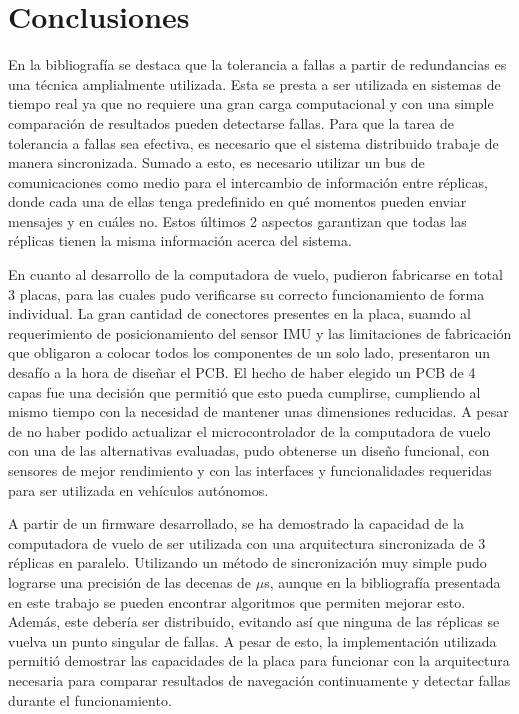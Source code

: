 \section{Conclusiones}

En la bibliografía se destaca que la tolerancia a fallas a partir de redundancias es una técnica amplialmente utilizada. Esta se presta a ser utilizada en sistemas de tiempo real ya que no requiere una gran carga computacional y con una simple comparación de resultados pueden detectarse fallas. Para que la tarea de tolerancia a fallas sea efectiva, es necesario que el sistema distribuido trabaje de manera sincronizada. Sumado a esto, es necesario utilizar un bus de comunicaciones como medio para el intercambio de información entre réplicas, donde cada una de ellas tenga predefinido en qué momentos pueden enviar mensajes y en cuáles no. Estos últimos 2 aspectos garantizan que todas las réplicas tienen la misma información acerca del sistema.

En cuanto al desarrollo de la computadora de vuelo, pudieron fabricarse en total 3 placas, para las cuales pudo verificarse su correcto funcionamiento de forma individual. La gran cantidad de conectores presentes en la placa, suamdo al requerimiento de posicionamiento del sensor IMU y las limitaciones de fabricación que obligaron a colocar todos los componentes de un solo lado, presentaron un desafío a la hora de diseñar el PCB. El hecho de haber elegido un PCB de 4 capas fue una decisión que permitió que esto pueda cumplirse, cumpliendo al mismo tiempo con la necesidad de mantener unas dimensiones reducidas. A pesar de no haber podido actualizar el microcontrolador de la computadora de vuelo con una de las alternativas evaluadas, pudo obtenerse un diseño funcional, con sensores de mejor rendimiento y con las interfaces y funcionalidades requeridas para ser utilizada en vehículos autónomos.

A partir de un firmware desarrollado, se ha demostrado la capacidad de la computadora de vuelo de ser utilizada con una arquitectura sincronizada de 3 réplicas en paralelo. Utilizando un método de sincronización muy simple pudo lograrse una precisión de las decenas de $\mu$s, aunque en la bibliografía presentada en este trabajo se pueden encontrar algoritmos que permiten mejorar esto. Además, este debería ser distribuido, evitando así que ninguna de las réplicas se vuelva un punto singular de fallas. A pesar de esto, la implementación utilizada permitió demostrar las capacidades de la placa para funcionar con la arquitectura necesaria para comparar resultados de navegación continuamente y detectar fallas durante el funcionamiento. 

